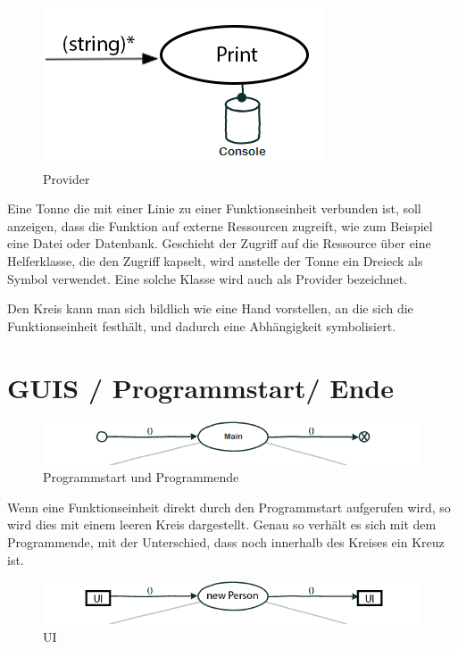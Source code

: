 \begin{figure}[!htbp]
	\centering
		\includegraphics[width=.5\linewidth]{./img/diagramProvider.png}
	\caption{Provider}
\end{figure}



Eine Tonne die mit einer Linie zu einer Funktionseinheit verbunden ist, soll
anzeigen, dass die Funktion auf externe Ressourcen zugreift, wie zum
Beispiel eine Datei oder Datenbank. 
Geschieht der Zugriff auf die Ressource über eine Helferklasse, die den Zugriff
kapselt, wird anstelle der Tonne ein Dreieck als Symbol verwendet. Eine solche
Klasse wird auch als Provider bezeichnet. 

Den Kreis kann man sich bildlich wie eine Hand vorstellen, an die sich die
Funktionseinheit festhält, und dadurch eine Abhängigkeit symbolisiert.

\pagebreak

\section{GUIS / Programmstart/ Ende}

\begin{figure}[!htbp]
	\centering
		\includegraphics[width=.9\linewidth]{./img/diagramStartEnd.png}
	\caption{Programmstart und Programmende}
\end{figure}




Wenn eine Funktionseinheit direkt durch den Programmstart aufgerufen wird, so
wird dies mit einem leeren Kreis dargestellt. Genau so verhält es sich mit dem
Programmende, mit der Unterschied, dass noch innerhalb des Kreises ein Kreuz ist.

\begin{figure}[!htbp]
	\centering
		\includegraphics[width=.9\linewidth]{./img/diagramUI.png}
	\caption{UI}
\end{figure}


